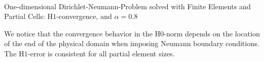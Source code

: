 \documentclass[a4paper,12pt]{article}
\makeatletter
\newenvironment{figurehere}
  {\def\@captype{figure}}
  {}
\makeatother
\begin{document}
\begin{center}
\begin{figurehere}
\\
\caption{One-dimensional Dirichlet-Neumann-Problem solved with Finite Elements and Partial Cells: H$1$-convergence, and $\alpha = 0.8$}\label{fig:neumann1dalpha08_H1}
\end{figurehere}
\end{center}
We notice that the convergence behavior in the H$0$-norm depends on the location of the end of the physical domain when imposing Neumann boundary conditions. The H$1$-error is consistent for all partial element sizes. 
\end{document}
